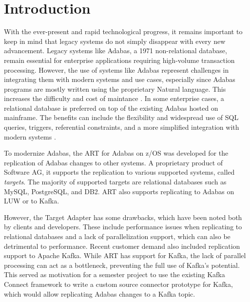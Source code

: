 \chapter{Introduction}
\label{ch01:intro}

With the ever-present and rapid technological progress, it remains important to keep in mind that legacy systems do not simply disappear with every new advancement. Legacy systems like Adabas, a 1971 non-relational database, remain essential for enterprise applications requiring high-volume transaction processing. However, the use of systems like Adabas represent challenges in integrating them with modern systems and use cases, especially since Adabas programs are mostly written using the proprietary Natural language. This increases the difficulty and cost of maintance \cite{ibm_redpaper_key}. In some enterprise cases, a relational database is preferred on top of the existing Adabas hosted on mainframe. The benefits can include the flexibility and widespread use of SQL queries, triggers, referential constraints, and a more simplified integration with modern systems \cite{ibm_redpaper_key}.

To modernize Adabas, the \ac{ART} for Adabas on z/OS was developed for the replication of Adabas changes to other systems. A proprietary product of Software AG, it supports the replication to various supported systems, called \textit{targets}. The majority of supported targets are relational databases such as MySQL, PostgreSQL, and DB2. \ac{ART} also supports replicating to Adabas on \ac{LUW} or to Kafka. %

However, the Target Adapter has some drawbacks, which have been noted both by clients and developers. These include performance issues when replicating to relational databases and a lack of parallelization support, which can also be detrimental to performance. Recent customer demand also included replication support to Apache Kafka. While \ac{ART} has support for Kafka, the lack of parallel processing can act as a bottleneck, preventing the full use of Kafka's potential. This served as motivation for a semester project to use the existing Kafka Connect framework to write a custom source connector prototype for Kafka, which would allow replicating Adabas changes to a Kafka topic.

